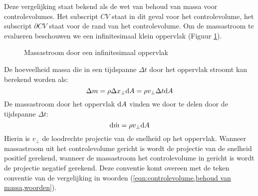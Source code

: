 Deze vergelijking staat bekend als de wet van behoud van massa voor controlevolumes. Het subscript $CV$ staat in dit geval voor het controlevolume, het subscript $\partial CV$ staat voor de rand van het controlevolume.
Om de massastroom te evalueren beschouwen we een infinitesimaal klein oppervlak (Figuur \ref{fig:massastroom}).
\begin{figure}[htb]
	\centering
	
	\caption{Massastroom door een infinitesimaal oppervlak}
	\label{fig:massastroom}
\end{figure}
De hoeveelheid massa die in een tijdspanne $\Delta t$ door het oppervlak stroomt kan berekend worden als:
\begin{equation}
	\Delta m = \rho \Delta x_{\perp} \mathrm{d} A = \rho v_{\perp} \Delta t \mathrm{d} A
	\label{eqn:hoeveelheid massa door een oppervlak}
\end{equation}
De massastroom door het oppervlak $\mathrm{d} A$ vinden we door te delen door de tijdspanne $\Delta t$:
\begin{equation}
	\mathrm{d} \dot{m}  = \rho v_{\perp} \mathrm{d} A
	\label{eqn:massastroom}
\end{equation}
Hierin is $v_{\perp}$ de loodrechte projectie van de snelheid op het oppervlak. Wanneer massastroom uit het controlevolume gericht is wordt de projectie van de snelheid positief gerekend, wanneer de massastroom het controlevolume in gericht is wordt de projectie negatief gerekend. Deze conventie komt overeen met de teken conventie van de vergelijking in woorden (\ref{eqn:controlevolume,behoud van massa,woorden}).
